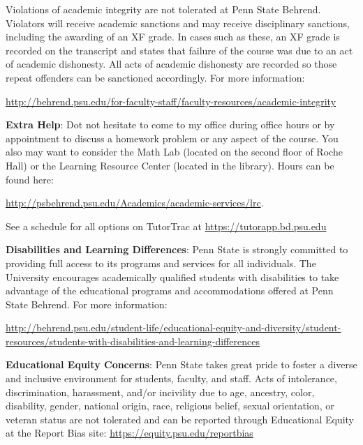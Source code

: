 \documentclass[11pt]{article}
\begin{document}
Violations of academic integrity are not tolerated at Penn State Behrend. Violators will receive academic sanctions and may receive disciplinary sanctions, including the awarding of an XF grade. In cases such as these, an XF grade is recorded on the transcript and states that failure of the course was due to an act of academic dishonesty. All acts of academic dishonesty are recorded so those repeat offenders can be sanctioned accordingly.
For more information: 
\begin{center}
\url{http://behrend.psu.edu/for-faculty-staff/faculty-resources/academic-integrity}
\end{center}

\vspace*{.10in}
\noindent\textbf{Extra Help}:
Dot not hesitate to come to my office during office hours or by appointment to discuss a homework problem or any aspect of the course.
You also may want to consider the Math Lab (located on the second floor of Roche Hall) or the Learning Resource Center (located in the library).
Hours can be found here: 
\begin{center}
\url{http://psbehrend.psu.edu/Academics/academic-services/lrc}.
\end{center}
See a schedule for all options on TutorTrac at \url{https://tutorapp.bd.psu.edu}


\vspace*{.10in}
\noindent\textbf{Disabilities and Learning Differences}:
Penn State is strongly committed to providing full access to its programs and services for all individuals. The University encourages academically qualified students with disabilities to take advantage of the educational programs and accommodations offered at Penn State Behrend.
For more information:
\begin{center}
\url{http://behrend.psu.edu/student-life/educational-equity-and-diversity/student-resources/students-with-disabilities-and-learning-differences}
\end{center}

\vspace*{.10in}
\noindent\textbf{Educational Equity Concerns}:
Penn State takes great pride to foster a diverse and inclusive environment for students, faculty, and staff.  Acts of intolerance, discrimination, harassment, and/or incivility due to age, ancestry, color, disability, gender, national origin, race, religious belief, sexual orientation, or veteran status are not tolerated and can be reported through Educational Equity at the Report Bias site: \url{https://equity.psu.edu/reportbias}
\end{document}
